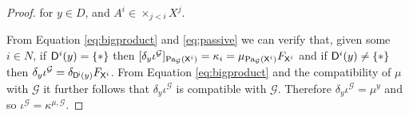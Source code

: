\begin{proof}
for $y\in D$, and $A^i\in \times_{j<i} X^j$.

From Equation \ref{eq:bigproduct} and \ref{eq:passive} we can verify that, given some $i\in N$, if $\mathsf{D}^i(y)=\{*\}$ then $[\delta_y \iota^{\mathcal{G}}]_{\text{Pa}_{\mathcal{G}}(\mathsf{X}^i)} = \kappa_i = \mu_{\text{Pa}_{\mathcal{G}}(\mathsf{X}^i)} F_{\mathsf{X}^i}$ and if $\mathsf{D}^i(y)\neq\{*\}$ then $\delta_y \iota^{\mathcal{G}} = \delta_{\mathsf{D^i}(y)} F_{\mathsf{X}^i}$. From Equation \ref{eq:bigproduct} and the compatibility of $\mu$ with $\mathcal{G}$ it further follows that $\delta_y\iota^\mathcal{G}$ is compatible with $\mathcal{G}$. Therefore $\delta_y \iota^\mathcal{G}=\mu^y$ and so $\iota^\mathcal{G}=\kappa^{\mu,\mathcal{G}}$.
\end{proof}